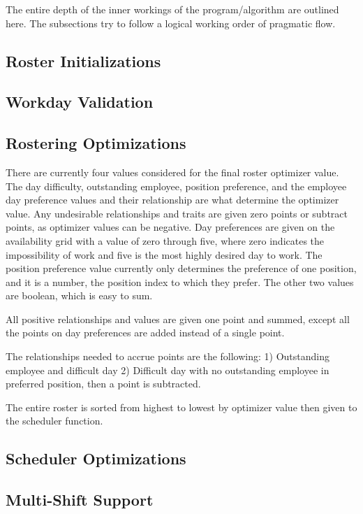 \documentclass[a4paper,11pt]{article}
\begin{document}
The entire depth of the inner workings of the program/algorithm are outlined here. 
The subsections try to follow a logical working order of pragmatic flow.

\subsection{Roster Initializations}
\subsection{Workday Validation}
\subsection{Rostering Optimizations}

There are currently four values considered for the final roster optimizer value.
The day difficulty, outstanding employee, position preference, and the employee day preference values and their relationship are what determine the optimizer value.
Any undesirable relationships and traits are given zero points or subtract points, as optimizer values can be negative.
Day preferences are given on the availability grid with a value of zero through five, where zero indicates the impossibility of work and five is the most highly desired day to work.
The position preference value currently only determines the preference of one position, and it is a number, the position index to which they prefer.
The other two values are boolean, which is easy to sum.

All positive relationships and values are given one point and summed, except all the points on day preferences are added instead of a single point.

The relationships needed to accrue points are the following:
1) Outstanding employee and difficult day
2) Difficult day with no outstanding employee in preferred position, then a point is subtracted.

The entire roster is sorted from highest to lowest by optimizer value then given to the scheduler function.

\subsection{Scheduler Optimizations}
\subsection{Multi-Shift Support}
\end{document}
